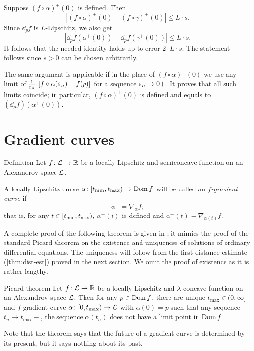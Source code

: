 Suppose $(f\circ\alpha)^+(0)$ is defined.
Then
\[|(f\circ\alpha)^+(0)-(f\circ\gamma)^+(0)|\le L\cdot s.\]
Since $\dd_pf$ is $L$-Lipschitz, we also get 
\[|\dd_pf(\alpha^+(0))-\dd_pf(\gamma^+(0))|\le L\cdot s.\]
It follows that the needed identity holds up to error $2\cdot L\cdot s$.
The statement follows since $s>0$ can be chosen arbitrarily.

The same argument is applicable if in the place of $(f\circ\alpha)^+(0)$
we use any limit of $\tfrac1{\eps_n}\cdot [f\circ\alpha(\eps_n)-f(p)]$ for a sequence $\varepsilon_n\to 0+$.
It proves that all such limits coincide; in particular, $(f\circ\alpha)^+(0)$ is defined and equals to $(\dd_pf)(\alpha^+(0))$.
\qeds


\section{Gradient curves}

\begin{thm}{Definition}\label{def:grad-curve}
Let $f\colon\mathcal{L}\to\mathbb{R}$ be a locally Lipschitz and semiconcave function on an Alexandrov space
$\mathcal{L}$.

A locally Lipschitz curve $\alpha\colon[t_{\min},t_{\max})\to\mathop{\rm Dom}\nolimits f$ will be called an \emph{$f$-gradient curve} if
\[\alpha^+=\nabla_{\alpha} f;\]
that is, for any $t\in[t_{\min},t_{\max})$, $\alpha^+(t)$ is defined and 
$\alpha^+(t)=\nabla_{\alpha(t)} f$.
\end{thm}

A complete proof of the following theorem is given in \cite{alexander-kapovitch-petrunin2024}; 
it mimics the proof of the standard Picard theorem on the existence  and uniqueness of solutions of ordinary differential equations.
The uniqueness will follow from the first distance estimate (\ref{thm:dist-est}) proved in the next section.
We omit the proof of existence as it is rather lengthy.

\begin{thm}{Picard theorem}\label{thm:glob-exist-grad-curv}
Let $f\colon\mathcal{L}\to \mathbb{R}$ be a locally Lipschitz and $\lambda$-concave function on an Alexandrov space $\mathcal{L}$.
Then for any $p\in \mathop{\rm Dom}\nolimits f$, there are unique $t_{\max}\in(0,\infty]$ and $f$-gradient curve $\alpha\colon[0,t_{\max})\to \mathcal{L}$ with $\alpha(0)=p$ such that any sequence $t_n\to t_{\max}-$, the sequence $\alpha(t_n)$ does not have a limit point in $\mathop{\rm Dom}\nolimits f$.
\end{thm}

Note that the theorem says that the future of a gradient curve is determined by its present, but it says nothing about its past.


